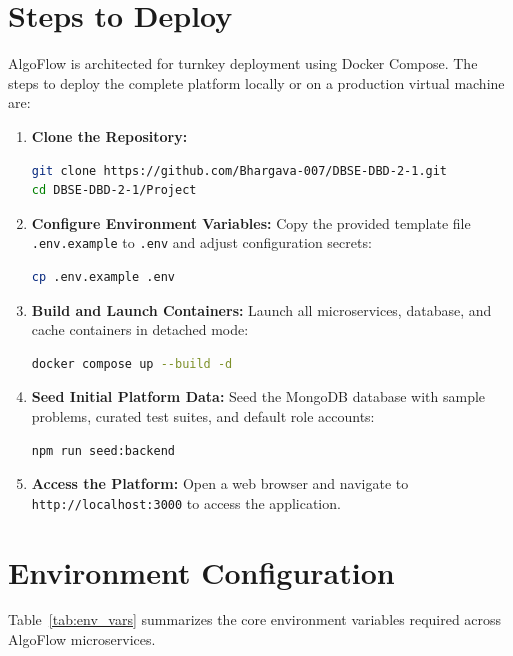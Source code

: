 \documentclass[12pt,a4paper]{report}
\begin{document}
\section{Steps to Deploy}
AlgoFlow is architected for turnkey deployment using Docker Compose. The steps to deploy the complete platform locally or on a production virtual machine are:
\begin{enumerate}[leftmargin=*, label=\bfseries\arabic*.]
  \item \textbf{Clone the Repository:}
  \begin{lstlisting}[language=bash]
git clone https://github.com/Bhargava-007/DBSE-DBD-2-1.git
cd DBSE-DBD-2-1/Project
  \end{lstlisting}

  \item \textbf{Configure Environment Variables:}
  Copy the provided template file \texttt{.env.example} to \texttt{.env} and adjust configuration secrets:
  \begin{lstlisting}[language=bash]
cp .env.example .env
  \end{lstlisting}

  \item \textbf{Build and Launch Containers:}
  Launch all microservices, database, and cache containers in detached mode:
  \begin{lstlisting}[language=bash]
docker compose up --build -d
  \end{lstlisting}

  \item \textbf{Seed Initial Platform Data:}
  Seed the MongoDB database with sample problems, curated test suites, and default role accounts:
  \begin{lstlisting}[language=bash]
npm run seed:backend
  \end{lstlisting}

  \item \textbf{Access the Platform:}
  Open a web browser and navigate to \texttt{http://localhost:3000} to access the application.
\end{enumerate}

\section{Environment Configuration}
Table~\ref{tab:env_vars} summarizes the core environment variables required across AlgoFlow microservices.
\end{document}
